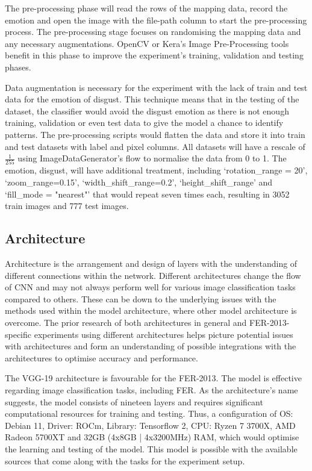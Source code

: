 \documentclass[conference]{IEEEtran}
\begin{document}
        The pre-processing phase will read the rows of the mapping data, record the emotion and open the image with the file-path column to start the pre-processing process. The pre-processing stage focuses on randomising the mapping data and any necessary augmentations. OpenCV or Kera's Image Pre-Processing tools benefit in this phase to improve the experiment's training, validation and testing phases.

        Data augmentation is necessary for the experiment with the lack of train and test data for the emotion of disgust. This technique means that in the testing of the dataset, the classifier would avoid the disgust emotion as there is not enough training, validation or even test data to give the model a chance to identify patterns. The pre-processing scripts would flatten the data and store it into train and test datasets with label and pixel columns. All datasets will have a rescale of $\frac{1}{255}$ using ImageDataGenerator's flow to normalise the data from 0 to 1. The emotion, disgust, will have additional treatment, including `rotation\_range = 20', `zoom\_range=0.15', `width\_shift\_range=0.2', `height\_shift\_range' and `fill\_mode = "nearest"' that would repeat seven times each, resulting in 3052 train images and 777 test images.

      \subsection{Architecture}
        Architecture is the arrangement and design of layers with the understanding of different connections within the network. Different architectures change the flow of CNN and may not always perform well for various image classification tasks compared to others. These can be down to the underlying issues with the methods used within the model architecture, where other model architecture is overcome. The prior research of both architectures in general and FER-2013-specific experiments using different architectures helps picture potential issues with architectures and form an understanding of possible integrations with the architectures to optimise accuracy and performance.

        The VGG-19 architecture is favourable for the FER-2013. The model is effective regarding image classification tasks, including FER. As the architecture's name suggests, the model consists of nineteen layers and requires significant computational resources for training and testing. Thus, a configuration of OS: Debian 11, Driver: ROCm, Library: Tensorflow 2, CPU: Ryzen 7 3700X, AMD Radeon 5700XT and 32GB (4x8GB | 4x3200MHz) RAM, which would optimise the learning and testing of the model. This model is possible with the available sources that come along with the tasks for the experiment setup.
\end{document}
